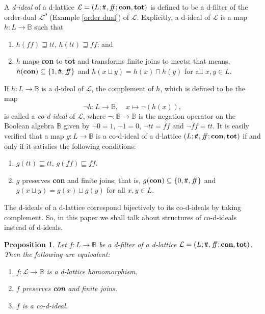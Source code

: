 \documentclass[11pt]{article}
\theoremstyle{plain}
\newtheorem{prop}[thm]{Proposition}
\theoremstyle{definition}
\newcommand{\bbB}{\mathbb{B}}
\newcommand{\dbt}{{t\!t}}
\newcommand{\dbf}{{f\!\!f}}
\newcommand{\lra}{\longrightarrow}
\begin{document}
A \emph{d-ideal} of a d-lattice  $\mathcal{L}=(L;\dbt,\dbf;{\bf con},{\bf tot})$ is defined to be a d-filter of the order-dual $\mathcal{L}^\partial$ (Example \ref{order dual}) of $\mathcal{L}$. Explicitly, a d-ideal of $\mathcal{L}$ is a map $h\colon L\lra \bbB$ such that \begin{enumerate}[label=\rm(\alph*)] \setlength{\itemsep}{0pt}  
\item $h(\dbf)\sqsupseteq \dbt$, $h(\dbt)\sqsupseteq  \dbf$; and 
\item $h$ maps  {\bf con} to {\bf tot} and transforms finite joins to meets; that means,  $h({\bf con})\subseteq\{1,\dbt,\dbf\}$ and $h(x\sqcup y)=h(x)\sqcap h(y)$ for all $x,y\in L$.  \end{enumerate}  

If $h\colon L\lra \bbB$ is a d-ideal of $\mathcal{L}$, the complement of $h$, which is defined to be the map $$\neg h\colon L\lra \bbB, \quad x\mapsto \neg (h(x)),$$ is called a \emph{co-d-ideal} of $\mathcal{L}$, where $\neg\colon\bbB\lra\bbB$ is the negation operator on the Boolean algebra $\bbB$ given by $\neg 0=1$, $\neg 1=0$, $\neg\dbt=\dbf$ and $\neg\dbf=\dbt$.
It is easily verified that a map $g\colon L\lra \bbB$ is a co-d-ideal of a d-lattice $(L;\dbt,\dbf;{\bf con},{\bf tot})$ if  and only if  it satisfies the following conditions: \begin{enumerate}[label=\rm(\alph*)] \setlength{\itemsep}{0pt}  
\item $g(\dbt)\sqsubseteq  \dbt$, $g(\dbf)\sqsubseteq \dbf$. 
\item $g$ preserves  {\bf con}  and finite joins; that is,  $g({\bf con})\subseteq\{0,\dbt,\dbf\}$  and $g(x\sqcup y)=g(x)\sqcup g(y)$ for all $x,y\in L$.  \end{enumerate}   
  
The d-ideals of a d-lattice correspond bijectively to its co-d-ideals by taking complement. So, in this paper we shall talk about structures of co-d-ideals instead of d-ideals.

\begin{prop} Let $f\colon L\lra\bbB$ be a d-filter of a d-lattice $\mathcal{L}=(L;\dbt,\dbf;{\bf con},{\bf tot})$. Then the following are equivalent: \begin{enumerate}[label=\rm(\arabic*)] \setlength{\itemsep}{0pt}  \item $f\colon \mathcal{L}\lra\bbB$ is a d-lattice homomorphism.
\item $f$ preserves  {\bf con}  and finite joins. 
\item $f$ is a co-d-ideal.  \end{enumerate}  \end{prop}
\end{document}
